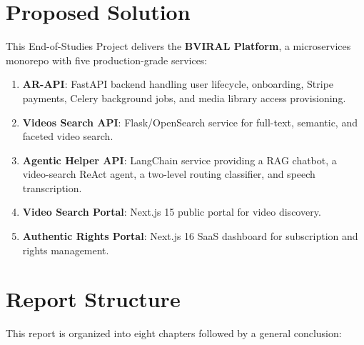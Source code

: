 \section*{Proposed Solution}

This End-of-Studies Project delivers the \textbf{BVIRAL Platform}, a microservices monorepo with five production-grade services:

\begin{enumerate}
  \item \textbf{AR-API}: FastAPI backend handling user lifecycle, onboarding, Stripe payments, Celery background jobs, and media library access provisioning.
  \item \textbf{Videos Search API}: Flask/OpenSearch service for full-text, semantic, and faceted video search.
  \item \textbf{Agentic Helper API}: LangChain service providing a RAG chatbot, a video-search ReAct agent, a two-level routing classifier, and speech transcription.
  \item \textbf{Video Search Portal}: Next.js 15 public portal for video discovery.
  \item \textbf{Authentic Rights Portal}: Next.js 16 SaaS dashboard for subscription and rights management.
\end{enumerate}

\section*{Report Structure}

This report is organized into eight chapters followed by a general conclusion:

